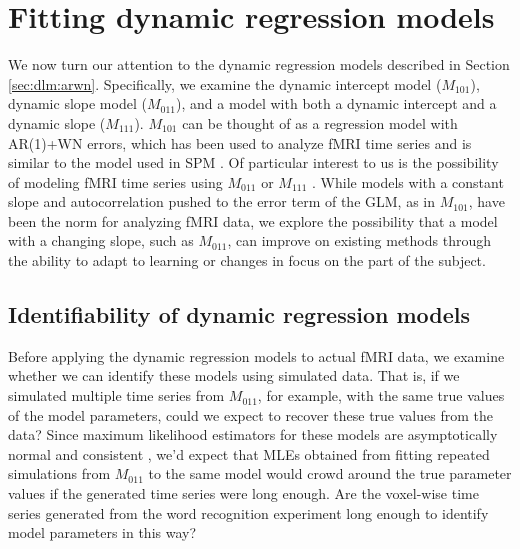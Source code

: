 \section{Fitting dynamic regression models \label{sec:fmri:dr}}

We now turn our attention to the dynamic regression models described in Section \ref{sec:dlm:arwn}. Specifically, we examine the dynamic intercept model ($M_{101}$), dynamic slope model ($M_{011}$), and a model with both a dynamic intercept and a dynamic slope ($M_{111}$). $M_{101}$ can be thought of as a regression model with AR(1)+WN errors, which has been used to analyze fMRI time series \citep{purdon:weiss:fpr:1998,burock:dale:fpr:2000} and is similar to the model used in SPM \citep{kiebel:holmes:spm:2007}. Of particular interest to us is the possibility of modeling fMRI time series using $M_{011}$ or $M_{111}$ . While models with a constant slope and autocorrelation pushed to the error term of the GLM, as in $M_{101}$, have been the norm for analyzing fMRI data, we explore the possibility that a model with a changing slope, such as $M_{011}$, can improve on existing methods through the ability to adapt to learning or changes in focus on the part of the subject.

\subsection{Identifiability of dynamic regression models \label{sec:fmri:id}}

Before applying the dynamic regression models to actual fMRI data, we examine whether we can identify these models using simulated data. That is, if we simulated multiple time series from $M_{011}$, for example, with the same true values of the model parameters, could we expect to recover these true values from the data? Since maximum likelihood estimators for these models are asymptotically normal and consistent \cite[Section 10.1][]{casella:berger:2002}, we'd expect that MLEs obtained from fitting repeated simulations from $M_{011}$ to the same model would crowd around the true parameter values if the generated time series were long enough. Are the voxel-wise time series generated from the word recognition experiment long enough to identify model parameters in this way?

